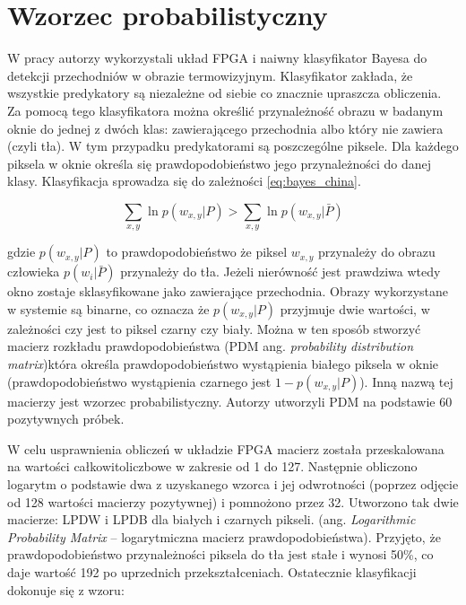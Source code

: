 \section{Wzorzec probabilistyczny}
\label{sec:xiao_2015}
W pracy \cite{xiao_2015} autorzy wykorzystali układ FPGA i naiwny klasyfikator Bayesa do detekcji przechodniów w obrazie termowizyjnym. Klasyfikator zakłada, że wszystkie predykatory są niezależne od siebie co znacznie upraszcza obliczenia. Za pomocą tego klasyfikatora można określić przynależność obrazu w badanym oknie do jednej z dwóch klas: zawierającego przechodnia albo który nie zawiera (czyli tła). W tym przypadku predykatorami są poszczególne piksele. Dla każdego piksela w oknie określa się prawdopodobieństwo jego przynależności do danej klasy. Klasyfikacja sprowadza się do zależności \eqref{eq:bayes_china}.

\begin{equation} \label{eq:bayes_china}
\sum_{x,y} \ln p(w_{x,y}|P) > \sum_{x,y} \ln p(w_{x,y}|\bar{P})
\end{equation}

\noindent gdzie \( p(w_{x,y}|P) \) to prawdopodobieństwo że piksel $w_{x,y}$ przynależy do obrazu człowieka
\( p(w_i|\bar{P}) \) przynależy do tła.
Jeżeli nierówność jest prawdziwa wtedy okno zostaje sklasyfikowane jako zawierające przechodnia.
Obrazy wykorzystane w systemie są binarne, co oznacza że \( p(w_{x,y}|P) \) przyjmuje dwie wartości, w zależności czy jest to piksel czarny czy biały. Można w ten sposób stworzyć macierz rozkładu prawdopodobieństwa (PDM ang. \textit{probability distribution matrix})która określa prawdopodobieństwo wystąpienia białego piksela w oknie (prawdopodobieństwo wystąpienia czarnego jest \(1-  p(w_{x,y}|P) \)). Inną nazwą tej macierzy jest wzorzec probabilistyczny.
Autorzy utworzyli PDM na podstawie 60 pozytywnych próbek. 

W celu usprawnienia obliczeń w układzie FPGA macierz została przeskalowana na wartości całkowitoliczbowe w zakresie od 1 do 127. 
Następnie obliczono logarytm o podstawie dwa z uzyskanego wzorca i jej odwrotności (poprzez odjęcie od 128 wartości macierzy pozytywnej) i pomnożono przez 32. %
Utworzono tak dwie macierze: LPDW i LPDB dla białych i czarnych pikseli. (ang. \textit{Logarithmic Probability Matrix} – logarytmiczna macierz prawdopodobieństwa). 
Przyjęto, że prawdopodobieństwo przynależności piksela do tła jest stałe i wynosi 50\%, co daje wartość 192 po uprzednich przekształceniach. 
Ostatecznie klasyfikacji dokonuje się z wzoru: 

